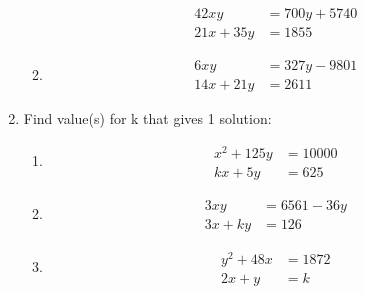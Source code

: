 \documentclass[a4paper,11pt]{article}
\begin{document}
\begin{enumerate}
\begin{multicols}{2}
\begin{enumerate}
\begin{align*}
42xy&=700y+5740\\
21x+35y&=1855
\end{align*}
\item \begin{align*}
6xy&=327y-9801\\
14x+21y&=2611
\end{align*}	
\end{enumerate}
\end{multicols}
\vspace{1cm}
\item Find value(s) for k that gives 1 solution:
\begin{multicols}{3}
\begin{enumerate}
\item \begin{align*}
x^2+125y&=10000\\
kx+5y&=625
\end{align*}
\item \begin{align*}
3xy&=6561-36y\\
3x+ky&=126
\end{align*}
\item \begin{align*}
y^2+48x&=1872\\
2x+y&=k
\end{align*}
	
\end{enumerate}
\end{multicols}
\end{enumerate}
\newpage
\end{document}
